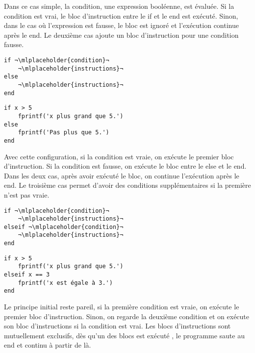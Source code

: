 \documentclass{tufte-handout}
\begin{document}
Dans ce cas simple, la condition, une expression booléenne, est évaluée. Si la condition est vrai, le bloc d'instruction entre le if et le end est exécuté. Sinon, dans le cas où l'expression est fausse, le bloc est ignoré et l'exécution continue après le end.
Le deuxième cas ajoute un bloc d'instruction pour une condition fausse.
\begin{fullwidth}
    \begin{minipage}{.45\linewidth}
    \begin{lstlisting}[title={Structure du if avec else}]
if ¬\mlplaceholder{condition}¬
    ¬\mlplaceholder{instructions}¬
else
    ¬\mlplaceholder{instructions}¬
end
    \end{lstlisting}
    \end{minipage}\hfill
    \begin{minipage}{.45\linewidth}
    \begin{lstlisting}[title={Exemple du if avec else}]
if x > 5
    fprintf('x plus grand que 5.')
else
    fprintf('Pas plus que 5.')
end
    \end{lstlisting}
    \end{minipage}
\end{fullwidth}
Avec cette configuration, si la condition est vraie, on exécute le premier bloc d'instruction. Si la condition est fausse, on exécute le bloc entre le else et le end. Dans les deux cas, après avoir exécuté le bloc, on continue l'exécution après le end.
Le troisième cas permet d'avoir des conditions supplémentaires si la première n'est pas vraie.
\begin{fullwidth}
    \begin{minipage}{.45\linewidth}
    \begin{lstlisting}[title={Structure du if avec elseif}]
if ¬\mlplaceholder{condition}¬
    ¬\mlplaceholder{instructions}¬
elseif ¬\mlplaceholder{condition}¬
    ¬\mlplaceholder{instructions}¬
end
    \end{lstlisting}
    \end{minipage}\hfill
    \begin{minipage}{.45\linewidth}
    \begin{lstlisting}[title={Exemple du if avec elseif}]
if x > 5
    fprintf('x plus grand que 5.')
elseif x == 3
    fprintf('x est égale à 3.')
end
    \end{lstlisting}
    \end{minipage}
\end{fullwidth}
Le principe initial reste pareil, si la première condition est vraie, on exécute le premier bloc d'instruction. Sinon, on regarde la deuxième condition et on exécute son bloc d'instructions si la condition est vrai.
Les blocs d'instructions sont mutuellement exclusifs, dès qu'un des blocs est exécuté
, le programme saute au end et continu à partir de là.
\end{document}
